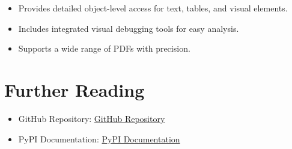 \begin{itemize}
    \item Provides detailed object-level access for text, tables, and visual elements.
    \item Includes integrated visual debugging tools for easy analysis.
    \item Supports a wide range of PDFs with precision.\cite{Singer:2022}
\end{itemize}

\section{Further Reading}
\label{sec:furtherreading}

\begin{itemize}
    \item GitHub Repository: \href{https://github.com/jsvine/pdfplumber}{GitHub Repository}
    \item PyPI Documentation: \href{https://pypi.org/project/pdfplumber/}{PyPI Documentation}
\end{itemize}

